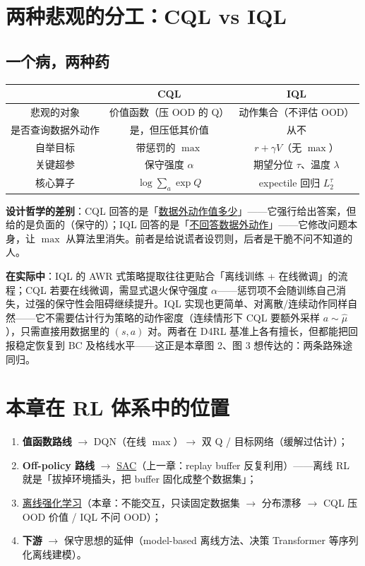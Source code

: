 \documentclass{article}
\begin{document}
\section*{两种悲观的分工：CQL vs IQL}

\subsection*{一个病，两种药}

\begin{center}
\begin{tabular}{c|c|c}
 & \textbf{CQL} & \textbf{IQL} \\
\hline
悲观的对象 & 价值函数（压 OOD 的 Q） & 动作集合（不评估 OOD） \\
是否查询数据外动作 & 是，但压低其价值 & 从不 \\
自举目标 & 带惩罚的 $\max$ & $r + \gamma V$（无 $\max$） \\
关键超参 & 保守强度 $\alpha$ & 期望分位 $\tau$、温度 $\lambda$ \\
核心算子 & $\log\sum_a\exp Q$ & expectile 回归 $L_2^\tau$ \\
\end{tabular}
\end{center}

\textbf{设计哲学的差别}：CQL 回答的是「\underline{数据外动作值多少}」——它强行给出答案，但给的是负面的（保守的）；IQL 回答的是「\underline{不回答数据外动作}」——它修改问题本身，让 $\max$ 从算法里消失。前者是给说谎者设罚则，后者是干脆不问不知道的人。

\textbf{在实际中}：IQL 的 AWR 式策略提取往往更贴合「离线训练 + 在线微调」的流程；CQL 若要在线微调，需显式退火保守强度 $\alpha$——惩罚项不会随训练自己消失，过强的保守性会阻碍继续提升。IQL 实现也更简单、对离散/连续动作同样自然——它不需要估计行为策略的动作密度（连续情形下 CQL 要额外采样 $a\sim\hat\mu$），只需直接用数据里的 $(s,a)$ 对。两者在 D4RL 基准上各有擅长，但都能把回报稳定恢复到 BC 及格线水平——这正是本章图 2、图 3 想传达的：两条路殊途同归。

\section*{本章在 RL 体系中的位置}

\begin{enumerate}
  \item \textbf{值函数路线} $\to$ DQN（在线 $\max$）$\to$ 双 Q / 目标网络（缓解过估计）；
  \item \textbf{Off-policy 路线} $\to$ \underline{SAC}（上一章：replay buffer 反复利用）——离线 RL 就是「拔掉环境插头，把 buffer 固化成整个数据集」；
  \item \underline{离线强化学习}（本章：不能交互，只读固定数据集 $\to$ 分布漂移 $\to$ CQL 压 OOD 价值 / IQL 不问 OOD）；
  \item \textbf{下游} $\to$ 保守思想的延伸（model-based 离线方法、决策 Transformer 等序列化离线建模）。
\end{enumerate}
\end{document}
